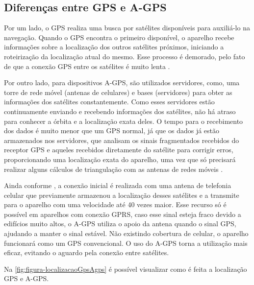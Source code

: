 \subsection{Diferenças entre GPS e A-GPS}

Por um lado, o GPS realiza uma busca por satélites disponíveis para auxiliá-lo na navegação. Quando o GPS encontra o primeiro disponível, o aparelho recebe informações sobre a localização dos outros satélites próximos, iniciando a roteirização da localização atual do mesmo. Esse processo é demorado, pelo fato de que a conexão GPS entre os satélites é muito lenta \cite{oficinanetagps:2018}.

Por outro lado, para dispositivos A-GPS, são utilizados servidores, como, uma torre de rede móvel (antenas de celulares) e bases (servidores) para obter as informações dos satélites constantemente. Como esses servidores estão continuamente enviando e recebendo informações dos satélites, não há atraso para conhecer a órbita e a localização exata deles. O tempo para o recebimento dos dados é muito menor que um GPS normal, já que os dados já estão armazenados nos servidores, que analisam os sinais fragmentados recebidos do receptor GPS e aqueles recebidos diretamente do satélite para corrigir erros, proporcionando uma localização exata do aparelho, uma vez que só precisará realizar alguns cálculos de triangulação com as antenas de redes móveis \cite{oficinanetagps:2018}.

Ainda conforme , a conexão inicial é realizada com uma antena de telefonia celular que previamente armazenou a localização desses satélites e a transmite para o aparelho com uma velocidade até 40 vezes maior. Esse recurso só é possível em aparelhos com conexão GPRS, caso esse sinal esteja fraco devido a edifícios muito altos, o A-GPS utiliza o apoio da antena quando o sinal GPS, ajudando a manter o sinal estável. Não existindo cobertura de celular, o aparelho funcionará como um GPS convencional. O uso do A-GPS torna a utilização mais eficaz, evitando o aguardo pela conexão entre satélites. 

Na \autoref{fig:figura-localizacaoGpsAgps} é possível visualizar como é feita a localização GPS e A-GPS.

